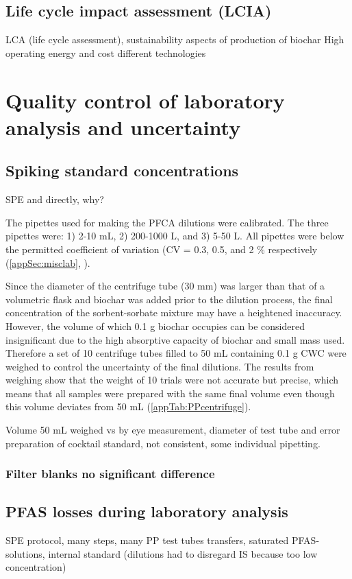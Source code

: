 \subsection{Life cycle impact assessment (LCIA)}
LCA (life cycle assessment), sustainability aspects of production of biochar
High operating energy and cost different technologies \citep{Alhashimi2017}

\section{Quality control of laboratory analysis and uncertainty}

\subsection{Spiking standard concentrations}
SPE and directly, why?

The pipettes used for making the PFCA dilutions were calibrated. The three pipettes were: 1) 2-10 mL, 2) 200-1000 \textmu L, and 3) 5-50 \textmu L. All pipettes were below the permitted coefficient of variation (CV = 0.3, 0.5, and 2 $\%$ respectively (\cref{appSec:misclab}, ).

Since the diameter of the centrifuge tube (30 mm) was larger than that of a volumetric flask and biochar was added prior to the dilution process, the final concentration of the sorbent-sorbate mixture may have a heightened inaccuracy. However, the volume of which 0.1 g biochar occupies can be considered insignificant due to the high absorptive capacity of biochar and small mass used. Therefore a set of 10 centrifuge tubes filled to 50 mL containing 0.1 g CWC were weighed to control the uncertainty of the final dilutions. The results from weighing show that the weight of 10 trials were not accurate but precise, which means that all samples were prepared with the same final volume even though this volume deviates from 50 mL (\cref{appTab:PPcentrifuge}). 

Volume 50 mL weighed vs by eye measurement, diameter of test tube and error
preparation of cocktail standard, not consistent, some individual pipetting. 

\subsubsection{Filter blanks no significant difference}

\subsection{PFAS losses during laboratory analysis}
SPE protocol, many steps, many PP test tubes transfers, saturated PFAS-solutions, internal standard (dilutions had to disregard IS because too low concentration)

